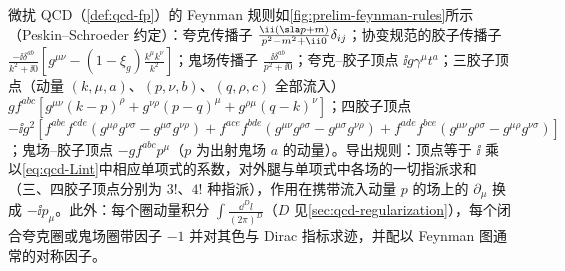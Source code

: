\begin{definition}[Feynman 规则]\label{def:prelim-feynman-rules}
微扰 QCD（\cref{def:qcd-fp}）的 Feynman 规则如\cref{fig:prelim-feynman-rules}所示（Peskin--Schroeder 约定\cite{PeskinSchroeder1995}）：夸克传播子 $\frac{\ii(\sla p+m)}{p^2-m^2+\ii0}\delta_{ij}$；协变规范的胶子传播子 $\frac{-\ii\delta^{ab}}{k^2+\ii0}[g^{\mu\nu}-(1-\xi_g)\frac{k^\mu k^\nu}{k^2}]$；鬼场传播子 $\frac{\ii\delta^{ab}}{p^2+\ii0}$；夸克--胶子顶点 $\ii g\gamma^\mu t^a$；三胶子顶点（动量 $(k,\mu,a)$、$(p,\nu,b)$、$(q,\rho,c)$ 全部流入）$gf^{abc}[g^{\mu\nu}(k-p)^\rho+g^{\nu\rho}(p-q)^\mu+g^{\rho\mu}(q-k)^\nu]$；四胶子顶点 $-\ii g^2[f^{abe}f^{cde}(g^{\mu\rho}g^{\nu\sigma}-g^{\mu\sigma}g^{\nu\rho})+f^{ace}f^{bde}(g^{\mu\nu}g^{\rho\sigma}-g^{\mu\sigma}g^{\nu\rho})+f^{ade}f^{bce}(g^{\mu\nu}g^{\rho\sigma}-g^{\mu\rho}g^{\nu\sigma})]$；鬼场--胶子顶点 $-gf^{abc}p^\mu$（$p$ 为出射鬼场 $a$ 的动量）。导出规则：顶点等于 $\ii$ 乘以\cref{eq:qcd-Lint}中相应单项式的系数，对外腿与单项式中各场的一切指派求和（三、四胶子顶点分别为 $3!$、$4!$ 种指派），作用在携带流入动量 $p$ 的场上的 $\partial_\mu$ 换成 $-\ii p_\mu$。此外：每个圈动量积分 $\int\frac{\dd^Dl}{(2\pi)^D}$（$D$ 见\cref{sec:qcd-regularization}），每个闭合夸克圈或鬼场圈带因子 $-1$ 并对其色与 Dirac 指标求迹，并配以 Feynman 图通常的对称因子。%
\end{definition}

